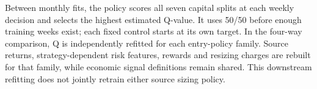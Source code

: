 Between monthly fits, the policy scores all seven capital splits at each weekly decision and selects the highest estimated Q-value. It uses 50/50 before enough training weeks exist; each fixed control starts at its own target. In the four-way comparison, Q is independently refitted for each entry-policy family. Source returns, strategy-dependent risk features, rewards and resizing charges are rebuilt for that family, while economic signal definitions remain shared. This downstream refitting does not jointly retrain either source sizing policy.

\FloatBarrier

